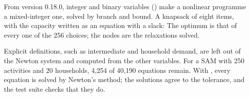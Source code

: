 
From version 0.18.0, integer and binary variables () make a
nonlinear programme a mixed-integer one, solved by branch and bound. A
knapsack of eight items, with the capacity written as an equation with a
slack:
The optimum is that of every one of the 256 choices; the nodes are the
relaxations solved.


Explicit definitions, such as intermediate and household demand, are left out
of the Newton system and computed from the other variables. For a SAM with 250
activities and 20 households, 4,254 of 40,190 equations remain. With
, every equation is solved by Newton's method; the solutions agree
to the tolerance, and the test suite checks that they do.


